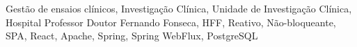 






\begin{keywords}
Gestão de ensaios clínicos, Investigação Clínica, Unidade de Investigação Clínica, Hospital Professor Doutor Fernando Fonseca, HFF, Reativo, Não-bloqueante, SPA, React, Apache, Spring, Spring WebFlux, PostgreSQL
\end{keywords} 
